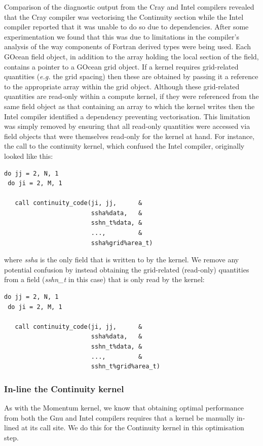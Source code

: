 \documentclass[journal]{IEEEtran}
\begin{document}
Comparison of the diagnostic output from the Cray and Intel
compilers revealed that the Cray compiler was vectorising the
Continuity section while the Intel compiler reported that it was
unable to do so due to dependencies. After some experimentation we
found that this was due to limitations in the compiler's analysis of
the way components of Fortran derived types were being used. Each
GOcean field object, in addition to the array holding the local
section of the field, contains a pointer to a GOcean grid object. If a
kernel requires grid-related quantities ({\it e.g.} the grid spacing)
then these are obtained by passing it a reference to the appropriate
array within the grid object. Although these grid-related quantities
are read-only within a compute kernel, if they were referenced from the
same field object as that containing an array to which the kernel writes
then the Intel compiler identified a dependency preventing
vectorisation.  This limitation was simply removed by ensuring that
all read-only quantities were accessed via field objects that were
themselves read-only for the kernel at hand.  For instance, the call
to the continuity kernel, which confused the Intel compiler, originally
looked like this:
\begin{verbatim}
do jj = 2, N, 1
 do ji = 2, M, 1

   call continuity_code(ji, jj,      &
                        ssha%data,   &
                        sshn_t%data, &
                        ...,         &
                        ssha%grid%area_t)
\end{verbatim}
where {\it ssha} is the only field that is written to by the kernel.
We remove any potential confusion by instead obtaining the
grid-related (read-only) quantities from a field ({\it sshn\_t} in
this case) that is only read by the kernel:
\begin{verbatim}
do jj = 2, N, 1
 do ji = 2, M, 1

   call continuity_code(ji, jj,      &
                        ssha%data,   &
                        sshn_t%data, &
                        ...,         &
                        sshn_t%grid%area_t)
\end{verbatim}

\subsubsection{In-line the Continuity kernel}
\label{sec_cont_inline}

As with the Momentum kernel, we know that obtaining optimal
performance from both the Gnu and Intel compilers requires that a
kernel be manually in-lined at its call site. We do this for the
Continuity kernel in this optimisation step.
\end{document}
